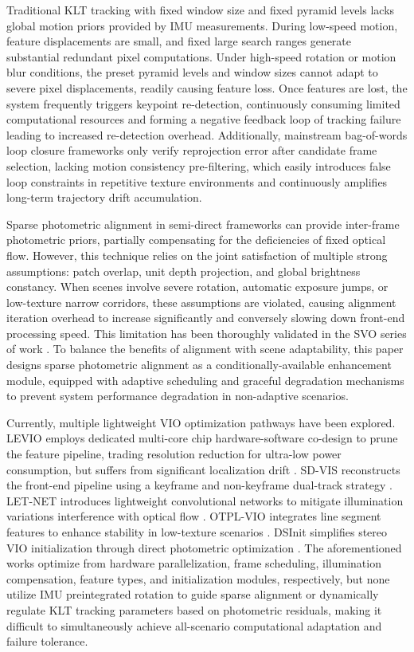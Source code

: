 \documentclass[journal,twoside,web]{ieeecolor}
\begin{document}
Traditional KLT tracking with fixed window size and fixed pyramid levels lacks global motion priors provided by IMU measurements. During low-speed motion, feature displacements are small, and fixed large search ranges generate substantial redundant pixel computations. Under high-speed rotation or motion blur conditions, the preset pyramid levels and window sizes cannot adapt to severe pixel displacements, readily causing feature loss. Once features are lost, the system frequently triggers keypoint re-detection, continuously consuming limited computational resources and forming a negative feedback loop of tracking failure leading to increased re-detection overhead. Additionally, mainstream bag-of-words loop closure frameworks only verify reprojection error after candidate frame selection, lacking motion consistency pre-filtering, which easily introduces false loop constraints in repetitive texture environments and continuously amplifies long-term trajectory drift accumulation.

Sparse photometric alignment in semi-direct frameworks can provide inter-frame photometric priors, partially compensating for the deficiencies of fixed optical flow. However, this technique relies on the joint satisfaction of multiple strong assumptions: patch overlap, unit depth projection, and global brightness constancy. When scenes involve severe rotation, automatic exposure jumps, or low-texture narrow corridors, these assumptions are violated, causing alignment iteration overhead to increase significantly and conversely slowing down front-end processing speed. This limitation has been thoroughly validated in the SVO series of work \cite{forster2017svo}. To balance the benefits of alignment with scene adaptability, this paper designs sparse photometric alignment as a conditionally-available enhancement module, equipped with adaptive scheduling and graceful degradation mechanisms to prevent system performance degradation in non-adaptive scenarios.

Currently, multiple lightweight VIO optimization pathways have been explored. LEVIO employs dedicated multi-core chip hardware-software co-design to prune the feature pipeline, trading resolution reduction for ultra-low power consumption, but suffers from significant localization drift \cite{kuhne2026levio}. SD-VIS reconstructs the front-end pipeline using a keyframe and non-keyframe dual-track strategy \cite{liu2020sdvis}. LET-NET introduces lightweight convolutional networks to mitigate illumination variations interference with optical flow \cite{lin2024letnet}. OTPL-VIO integrates line segment features to enhance stability in low-texture scenarios \cite{chen2026otpl}. DSInit simplifies stereo VIO initialization through direct photometric optimization \cite{qiu2026dsinit}. The aforementioned works optimize from hardware parallelization, frame scheduling, illumination compensation, feature types, and initialization modules, respectively, but none utilize IMU preintegrated rotation to guide sparse alignment or dynamically regulate KLT tracking parameters based on photometric residuals, making it difficult to simultaneously achieve all-scenario computational adaptation and failure tolerance.
\end{document}
